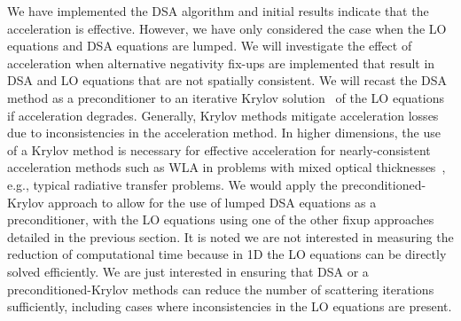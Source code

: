 \documentclass[11pt]{article}
\newcommand{\B}[1]{\ensuremath{\mathbf{#1}}}
\begin{document}
We have implemented the DSA algorithm and initial results indicate that the
acceleration is effective.  However, we have only considered the case when
the LO equations and DSA equations are lumped.  We will investigate the effect of acceleration when alternative negativity fix-ups are
implemented that result in DSA and LO equations that are not spatially consistent.
We will recast the DSA method as a preconditioner to an iterative
Krylov solution~\cite{larson_morel_sn} of the LO equations if acceleration degrades.  Generally, Krylov
methods mitigate acceleration losses due to inconsistencies in the acceleration
method.  In higher dimensions, the use of a Krylov method is necessary for effective
acceleration for nearly-consistent acceleration methods such as WLA in problems with
mixed optical thicknesses~\cite{larson_morel_sn}, e.g., typical radiative transfer
problems.
  We would apply the preconditioned-Krylov approach to allow for the use of lumped DSA
  equations as a preconditioner, with the LO equations using one of the other fixup
approaches detailed
in the previous section.  It is noted we are not interested in measuring the reduction of
computational time because in 1D the LO equations can be directly solved efficiently.
We are just interested in ensuring that DSA or a preconditioned-Krylov methods can reduce the
number of scattering iterations sufficiently, including cases where inconsistencies
in the LO equations are present.  %
%
%
\end{document}
